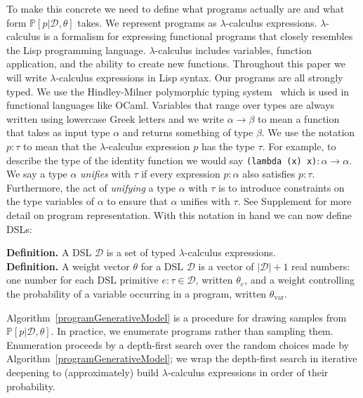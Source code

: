 \documentclass{article}
\newcommand{\probability}{\mathds{P}} %
\begin{document}
To make this concrete we need to define what programs actually are and
what form $\probability[p |\mathcal{D},\theta]$ takes.
We represent programs as $\lambda$-calculus expressions.
$\lambda$-calculus is a formalism for expressing functional programs
that closely resembles the Lisp programming language.
$\lambda$-calculus includes variables, function application, and the ability to create new functions.
Throughout this paper we will write $\lambda$-calculus expressions in Lisp syntax.
Our programs are all strongly typed.
We use the Hindley-Milner polymorphic typing system~\cite{pierce} which is used in functional languages like OCaml.
Variables that range over types are always written using lowercase Greek letters
and we write $\alpha\to \beta$ to mean a function that takes as input type $\alpha$
and returns something of type $\beta$.
We use the notation $p:\tau$ to mean that the $\lambda$-calculus expression $p$
has the type $\tau$.
For example, to describe the type of the identity function
we would say \texttt{(lambda (x) x)}$:\alpha\to \alpha$.
We say a type $\alpha$ \emph{unifies} with $\tau$ if every expression
$p:\alpha$ also satisfies $p:\tau$. Furthermore, the act of \emph{unifying}
a type $\alpha$ with $\tau$ is to introduce constraints on the type
variables of $\alpha$ to ensure that $\alpha$ unifies with $\tau$.
See Supplement for more detail on program representation.
With this notation in hand we can now define DSLs:

\noindent\textbf{Definition.}
A DSL $\mathcal{D}$ is a set of typed $\lambda$-calculus expressions.
\\\noindent\textbf{Definition.}
A weight vector $\theta$ for a DSL $\mathcal{D}$ is a vector of $|\mathcal{D}| + 1$ real numbers:
one number for each DSL primitive $e:\tau\in \mathcal{D}$, written $\theta_e$,
and a weight controlling the probability of a variable occurring in a program, written $\theta_{\text{var}}$.

Algorithm~\ref{programGenerativeModel} is a procedure for drawing
samples from $\probability[p|\mathcal{D},\theta]$.  In practice, we
enumerate programs rather than sampling them.  Enumeration proceeds by
a depth-first search over the random choices made by
Algorithm~\ref{programGenerativeModel}; we wrap the depth-first search
in iterative deepening to (approximately) build $\lambda$-calculus
expressions in order of their probability.
\end{document}
